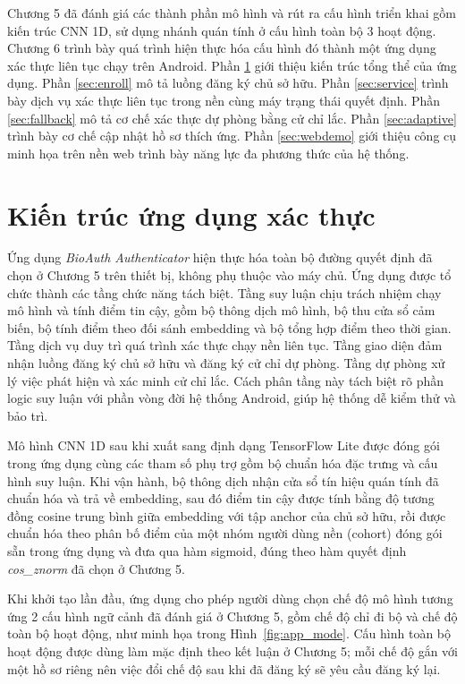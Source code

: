 \documentclass[../DoAn.tex]{subfiles}
\begin{document}
Chương 5 đã đánh giá các thành phần mô hình và rút ra cấu hình triển khai gồm kiến trúc CNN 1D, sử dụng nhánh quán tính ở cấu hình toàn bộ 3 hoạt động. Chương 6 trình bày quá trình hiện thực hóa cấu hình đó thành một ứng dụng xác thực liên tục chạy trên Android. Phần \ref{sec:apptongquan} giới thiệu kiến trúc tổng thể của ứng dụng. Phần \ref{sec:enroll} mô tả luồng đăng ký chủ sở hữu. Phần \ref{sec:service} trình bày dịch vụ xác thực liên tục trong nền cùng máy trạng thái quyết định. Phần \ref{sec:fallback} mô tả cơ chế xác thực dự phòng bằng cử chỉ lắc. Phần \ref{sec:adaptive} trình bày cơ chế cập nhật hồ sơ thích ứng. Phần \ref{sec:webdemo} giới thiệu công cụ minh họa trên nền web trình bày năng lực đa phương thức của hệ thống.

\section{Kiến trúc ứng dụng xác thực}
\label{sec:apptongquan}

Ứng dụng \textit{BioAuth Authenticator} hiện thực hóa toàn bộ đường quyết định đã chọn ở Chương 5 trên thiết bị, không phụ thuộc vào máy chủ. Ứng dụng được tổ chức thành các tầng chức năng tách biệt. Tầng suy luận chịu trách nhiệm chạy mô hình và tính điểm tin cậy, gồm bộ thông dịch mô hình, bộ thu cửa sổ cảm biến, bộ tính điểm theo đối sánh embedding và bộ tổng hợp điểm theo thời gian. Tầng dịch vụ duy trì quá trình xác thực chạy nền liên tục. Tầng giao diện đảm nhận luồng đăng ký chủ sở hữu và đăng ký cử chỉ dự phòng. Tầng dự phòng xử lý việc phát hiện và xác minh cử chỉ lắc. Cách phân tầng này tách biệt rõ phần logic suy luận với phần vòng đời hệ thống Android, giúp hệ thống dễ kiểm thử và bảo trì.

Mô hình CNN 1D sau khi xuất sang định dạng TensorFlow Lite được đóng gói trong ứng dụng cùng các tham số phụ trợ gồm bộ chuẩn hóa đặc trưng và cấu hình suy luận. Khi vận hành, bộ thông dịch nhận cửa sổ tín hiệu quán tính đã chuẩn hóa và trả về embedding, sau đó điểm tin cậy được tính bằng độ tương đồng cosine trung bình giữa embedding với tập anchor của chủ sở hữu, rồi được chuẩn hóa theo phân bố điểm của một nhóm người dùng nền (cohort) đóng gói sẵn trong ứng dụng và đưa qua hàm sigmoid, đúng theo hàm quyết định \textit{cos\_znorm} đã chọn ở Chương 5.

Khi khởi tạo lần đầu, ứng dụng cho phép người dùng chọn chế độ mô hình tương ứng 2 cấu hình ngữ cảnh đã đánh giá ở Chương 5, gồm chế độ chỉ đi bộ và chế độ toàn bộ hoạt động, như minh họa trong Hình~\ref{fig:app_mode}. Cấu hình toàn bộ hoạt động được dùng làm mặc định theo kết luận ở Chương 5; mỗi chế độ gắn với một hồ sơ riêng nên việc đổi chế độ sau khi đã đăng ký sẽ yêu cầu đăng ký lại.
\end{document}
